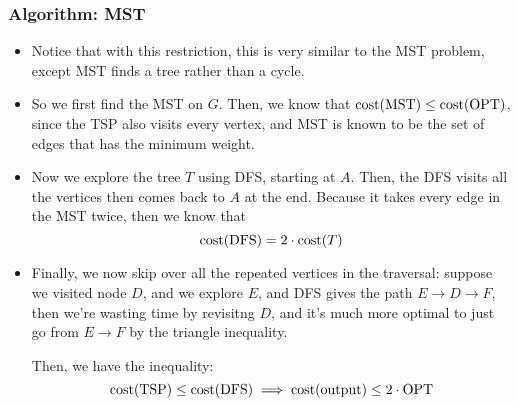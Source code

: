 \subsubsection{Algorithm: MST}
\begin{itemize}
	\item Notice that with this restriction, this is very similar to the MST problem, except MST finds 
		a tree rather than a cycle. 
	\item So we first find the MST on \( G \). Then, we know that \( \mathrm{cost}(\text{MST}) \le  \mathrm{cost}(\text{OPT}) \),
		since the TSP also visits every vertex, and MST is known to be the set of edges that has the minimum 
		weight. 

		\begin{center}
		\end{center}


	\item Now we explore the tree \( T \) using DFS, starting at \( A \). Then, the DFS visits all the vertices
		then comes back to \( A \) at the end. Because it takes every edge in the MST twice, then we know that 
		\[
		\mathrm{cost}( \text{DFS}) = 2\cdot \mathrm{cost}(T)
		\] 
	\item Finally, we now skip over all the repeated vertices in the traversal: suppose we visited node \( D \), 
		and we explore \( E \), and DFS gives the path \( E \to D \to F \), then we're wasting time by revisitng 
		\( D \), and it's much more optimal to just go from \( E \to F \) by the triangle inequality.

		Then, we have the inequality:
		\[
		\mathrm{cost}(\text{TSP}) \le  \mathrm{cost}(\text{DFS}) \implies \mathrm{cost}(\text{output}) \le  2 \cdot \text{OPT}
		\] 

\end{itemize}
